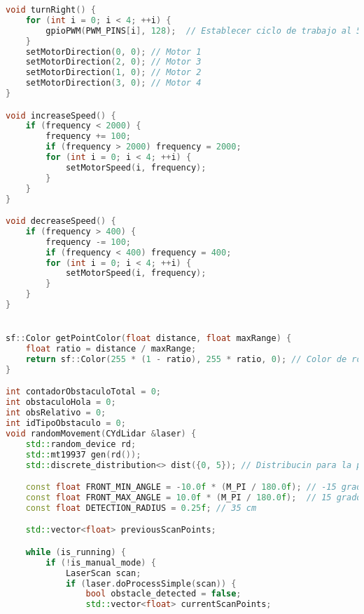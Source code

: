 \begin{lstlisting}[language={C++}, caption={Primer ajuste de c\'odigo}, label={Script}]
void turnRight() {
    for (int i = 0; i < 4; ++i) {
        gpioPWM(PWM_PINS[i], 128);  // Establecer ciclo de trabajo al 50%
    }
    setMotorDirection(0, 0); // Motor 1
    setMotorDirection(2, 0); // Motor 3
    setMotorDirection(1, 0); // Motor 2
    setMotorDirection(3, 0); // Motor 4
}

void increaseSpeed() {
    if (frequency < 2000) {
        frequency += 100;
        if (frequency > 2000) frequency = 2000;
        for (int i = 0; i < 4; ++i) {
            setMotorSpeed(i, frequency);
        }
    }
}

void decreaseSpeed() {
    if (frequency > 400) {
        frequency -= 100;
        if (frequency < 400) frequency = 400;
        for (int i = 0; i < 4; ++i) {
            setMotorSpeed(i, frequency);
        }
    }
}


sf::Color getPointColor(float distance, float maxRange) {
    float ratio = distance / maxRange;
    return sf::Color(255 * (1 - ratio), 255 * ratio, 0); // Color de rojo a verde
}

int contadorObstaculoTotal = 0;
int obstaculoHola = 0;
int obsRelativo = 0;
int idTipoObstaculo = 0;
void randomMovement(CYdLidar &laser) {
    std::random_device rd;
    std::mt19937 gen(rd());
    std::discrete_distribution<> dist({0, 5}); // Distribucin para la probabilidad de movimiento

    const float FRONT_MIN_ANGLE = -10.0f * (M_PI / 180.0f); // -15 grados en radaianes
    const float FRONT_MAX_ANGLE = 10.0f * (M_PI / 180.0f);  // 15 grados en radianes
    const float DETECTION_RADIUS = 0.25f; // 35 cm

    std::vector<float> previousScanPoints;

    while (is_running) {
        if (!is_manual_mode) {
            LaserScan scan;
            if (laser.doProcessSimple(scan)) {
                bool obstacle_detected = false;
                std::vector<float> currentScanPoints;
                

\end{lstlisting}
